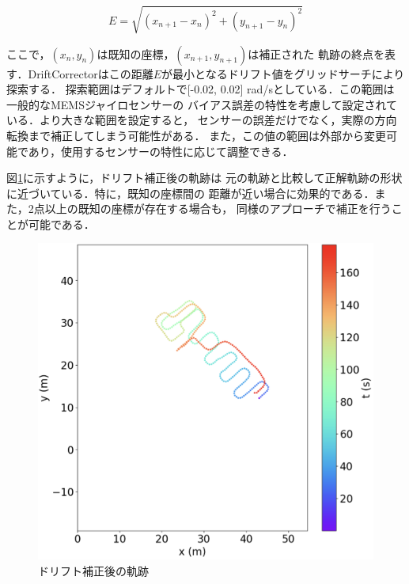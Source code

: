 \begin{equation}
    E = \sqrt{(x_{n+1} - x_n)^2 + (y_{n+1} - y_n)^2}
\end{equation}

ここで，$(x_n, y_n)$は既知の座標，$(x_{n+1}, y_{n+1})$は補正された
軌跡の終点を表す．DriftCorrectorはこの距離$E$が最小となるドリフト値をグリッドサーチにより探索する．
探索範囲はデフォルトで[-0.02, 0.02] rad/sとしている．この範囲は一般的なMEMSジャイロセンサーの
バイアス誤差の特性を考慮して設定されている．より大きな範囲を設定すると，
センサーの誤差だけでなく，実際の方向転換まで補正してしまう可能性がある．
また，この値の範囲は外部から変更可能であり，使用するセンサーの特性に応じて調整できる．


図\ref{fig:pdr-remove-drift}に示すように，ドリフト補正後の軌跡は
元の軌跡と比較して正解軌跡の形状に近づいている．特に，既知の座標間の
距離が近い場合に効果的である．また，2点以上の既知の座標が存在する場合も，
同様のアプローチで補正を行うことが可能である．

\begin{figure}[H]
	\centering
	\includegraphics[width=\linewidth]{image/pdr-remove-drift-two.jpg}
	\caption{ドリフト補正後の軌跡}    \label{fig:pdr-remove-drift}
\end{figure}

